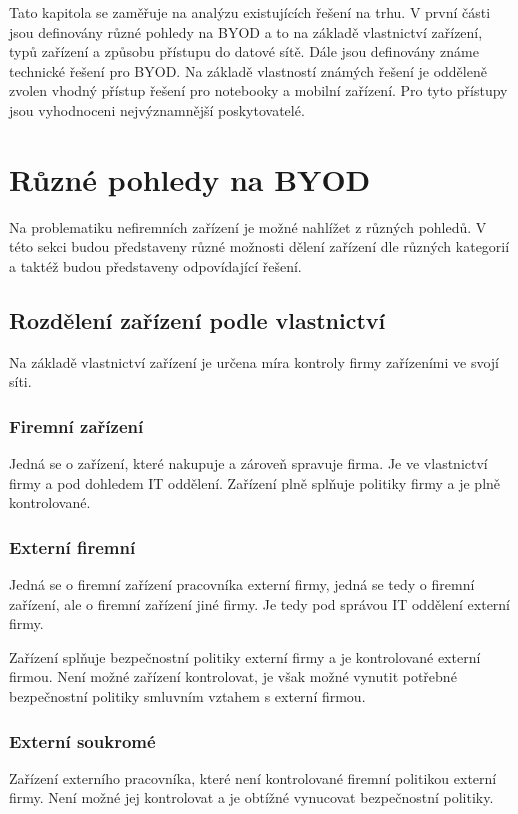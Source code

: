 Tato kapitola se zaměřuje na analýzu existujících řešení na trhu. V první části jsou definovány různé pohledy na BYOD a to na základě vlastnictví zařízení, typů zařízení a způsobu přístupu do datové sítě. Dále jsou definovány známe technické řešení pro BYOD. Na základě vlastností známých řešení je odděleně zvolen vhodný přístup řešení pro notebooky a mobilní zařízení. Pro tyto přístupy jsou vyhodnoceni nejvýznamnější poskytovatelé. 


 \section{Různé pohledy na BYOD}
 Na problematiku nefiremních zařízení je možné nahlížet z různých pohledů. V této sekci budou představeny různé možnosti dělení zařízení dle různých kategorií a taktéž budou představeny odpovídající řešení.
 
 \subsection{Rozdělení zařízení podle vlastnictví}
 Na základě vlastnictví zařízení je určena míra kontroly firmy zařízeními ve svojí síti.
 
 \subsubsection{Firemní zařízení}
 Jedná se o zařízení, které nakupuje a zároveň spravuje firma. Je ve vlastnictví firmy a pod dohledem IT oddělení. Zařízení plně splňuje politiky firmy a je plně kontrolované.
 
 \subsubsection{Externí firemní}
 Jedná se o firemní zařízení pracovníka externí firmy, jedná se tedy o firemní zařízení, ale o firemní zařízení jiné firmy. Je tedy pod správou IT oddělení externí firmy.
 
 Zařízení splňuje bezpečnostní politiky externí firmy a je kontrolované externí firmou. Není možné zařízení kontrolovat, je však možné vynutit potřebné bezpečnostní politiky smluvním vztahem s externí firmou.
 
 \subsubsection{Externí soukromé}
 Zařízení externího pracovníka, které není kontrolované firemní politikou externí firmy. Není možné jej kontrolovat a je obtížné vynucovat bezpečnostní politiky.
 
